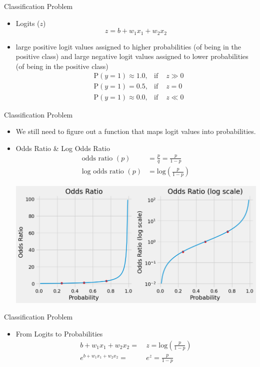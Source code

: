 \documentclass[pdflatex,compress,mathserif]{beamer}
\begin{document}
\begin{frame}{Classification Problem}
	\begin{itemize}
		\item Logits ($z$)
		$$
		z = b + w_1x_1 + w_2x_2
		$$
		\item large positive logit values assigned to higher probabilities (of being in the positive class) and large negative logit values assigned to lower probabilities (of being in the positive class)
		$$
		\begin{aligned}
			& \text{P}(y=1) \approx 1.0, & \text{if } &z \gg 0
			\\
			& \text{P}(y=1) = 0.5, & \text{if } &z = 0
			\\
			& \text{P}(y=1) \approx 0.0, & \text{if } &z \ll 0
		\end{aligned}
		$$
	\end{itemize}
\end{frame}

\begin{frame}{Classification Problem}
	\begin{itemize}
		\item We still need to figure out a function that maps logit values into probabilities.
		\item Odds Ratio \& Log Odds Ratio
		\begin{align*}
			\text{odds ratio }(p) &= \frac{p}{q} = \frac{p}{1-p} \\
			\text{log odds ratio }(p) &= \text{log}\left(\frac{p}{1-p}\right)
		\end{align*}
		\begin{center}
			\includegraphics[width=0.7\linewidth]{img/19}
		\end{center}
	\end{itemize}
	\vfill\null
\end{frame}

\begin{frame}{Classification Problem}
	\begin{itemize}
		\item From Logits to Probabilities
		$$
		\begin{aligned}
			b + w_1x_1 + w_2x_2 = &\ z = \text{log}\left(\frac{p}{1-p}\right) \nonumber
			\\
			e^{b + w_1x_1 + w_2x_2} = &\ e^z = \frac{p}{1-p} \nonumber
		\end{aligned}
		$$
	\end{itemize}
\end{frame}
\end{document}

